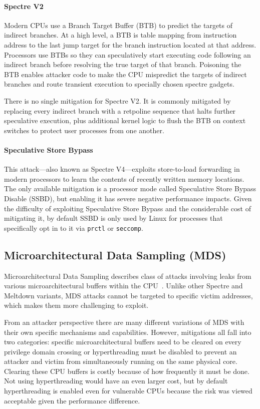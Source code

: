 \paragraph{Spectre V2~\cite{kocher:spectre}}

Modern CPUs use a Branch Target Buffer (BTB) to predict the targets of indirect branches.
At a high level, a BTB is table mapping from instruction address to the last jump target for the branch instruction located at that address.
Processors use BTBs so they can speculatively start executing code following an indirect branch before resolving the true target of that branch.
Poisoning the BTB enables attacker code to make the CPU mispredict the targets of indirect branches and route transient execution to specially chosen spectre gadgets.

There is no single mitigation for Spectre V2.
It is commonly mitigated by replacing every indirect branch with a retpoline sequence \cite{intel:retpoline} that halts further speculative execution, plus additional kernel logic to flush the BTB on context switches to protect user processes from one another.

\paragraph{Speculative Store Bypass~\cite{horn:speculative-store-bypass}}
This attack---also known as Spectre V4---exploits store-to-load forwarding in modern processors to learn the contents of recently written memory locations.
The only available mitigation is a processor mode called Speculative Store Bypass Disable (SSBD), but enabling it has severe negative performance impacts.
Given the difficulty of exploiting Speculative Store Bypass and the considerable cost of mitigating it, by default SSBD is only used by Linux for processes that specifically opt in to it via \texttt{prctl} or \texttt{seccomp}.

\subsection{Microarchitectural Data Sampling (MDS)}
Microarchitectural Data Sampling describes class of attacks involving leaks from various microarchitectural buffers within the CPU~\cite{canella:fallout, schwarz:zombieload,schaik:ridl}.
Unlike other Spectre and Meltdown variants, MDS attacks cannot be targeted to specific victim addresses, which makes them more challenging to exploit.

From an attacker perspective there are many different variations of MDS with their own specific mechanisms and capabilities.
However, mitigations all fall into two categories: specific microarchitectural buffers need to be cleared on every privilege domain crossing or hyperthreading must be disabled to prevent an attacker and victim from simultaneously running on the same physical core.
Clearing these CPU buffers is costly because of how frequently it must be done.
Not using hyperthreading would have an even larger cost, but by default
hyperthreading is enabled even for vulnerable CPUs because the risk was viewed acceptable given the performance difference.

